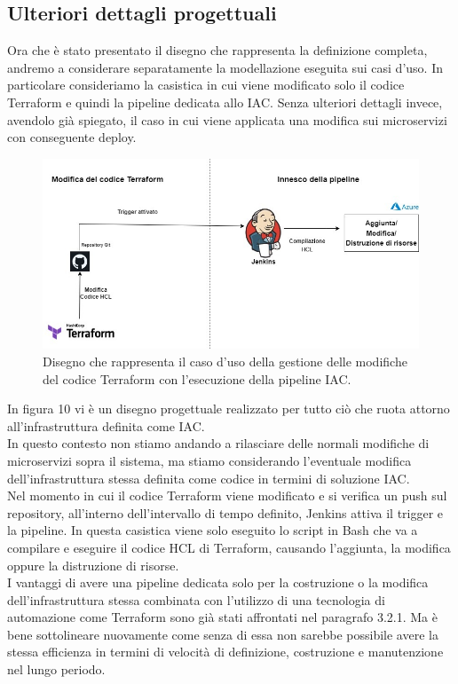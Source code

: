 \documentclass[a4paper,12pt]{report}
\begin{document}
\subsection{Ulteriori dettagli progettuali}
Ora che è stato presentato il disegno che rappresenta la definizione completa, andremo a considerare separatamente la modellazione eseguita sui casi d'uso. In particolare consideriamo la casistica in cui viene modificato solo il codice Terraform e quindi la pipeline dedicata allo IAC. Senza ulteriori dettagli invece, avendolo già spiegato, il caso in cui viene applicata una modifica sui microservizi con conseguente deploy. \\  
\begin{figure}[h]
	\includegraphics[width=1.0\textwidth]{modifica_terraform}
    \caption{Disegno che rappresenta il caso d'uso della gestione delle modifiche del codice Terraform con l'esecuzione della pipeline IAC.}
    \label{fig:modifica_terraform}
\end{figure} 
\newline In figura 10 vi è un disegno progettuale realizzato per tutto ciò che ruota attorno all'infrastruttura definita come IAC.\\
In questo contesto non stiamo andando a rilasciare delle normali modifiche di microservizi sopra il sistema, ma stiamo considerando l'eventuale modifica dell'infrastruttura stessa definita come codice in termini di soluzione IAC.\\
Nel momento in cui il codice Terraform viene modificato e si verifica un push sul repository, all'interno dell'intervallo di tempo definito, Jenkins attiva il trigger e la pipeline. In questa casistica viene solo eseguito lo script in Bash che va a compilare e eseguire il codice HCL di Terraform, causando l'aggiunta, la modifica oppure la distruzione di risorse.\\
I vantaggi di avere una pipeline dedicata solo per la costruzione o la modifica dell'infrastruttura stessa combinata con l'utilizzo di una tecnologia di automazione come Terraform sono già stati affrontati nel paragrafo 3.2.1. Ma è bene sottolineare nuovamente come senza di essa non sarebbe possibile avere la stessa efficienza in termini di velocità di definizione, costruzione e manutenzione nel lungo periodo.\\
\end{document}
